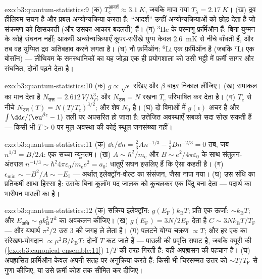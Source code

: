 \begin{solution}{exo:b3:quantum-statistics:9}
(क) $T_{\text{c}}^{\text{आदर्श}} \approx \qty{3.1}{K}$, जबकि
मापा गया $T_\lambda = \qty{2.17}{K}$। (ख) द्रव हीलियम सघन है और
प्रबल अन्योन्यक्रिया करता है: ``आदर्श'' उन्हीं अन्योन्यक्रियाओं को
छोड़ देता है जो संक्रमण को खिसकाती (और उसका आकार बदलती) हैं। (ग)
$^3$He के परमाणु फ़र्मिऑन हैं: बिना युग्मन के कोई संघनन नहीं;
आकर्षी अन्योन्यक्रियाएँ कूपर-सरीखे युग्म केवल \qty{2.6}{mK} से
नीचे बाँधती हैं, और तब वह युग्मित द्रव अतिबहाव करने लगता है। (घ) नौ
फ़र्मिऑन: $^6$Li एक फ़र्मिऑन है (जबकि
$^7$Li एक बोसॉन) --- लीथियम के समस्थानिकों का यह जोड़ा एक ही
प्रयोगशाला को उसी भट्ठी में फ़र्मी सागर और संघनित, दोनों पढ़ने देता है।
\end{solution}

\begin{solution}{exo:b3:quantum-statistics:10}
(क) $g \propto \sqrt\epsilon$ रखिए और $\beta$ बाहर निकाल लीजिए।
(ख) समाकल का मान देता है $N_{\text{उत्त}} =
2.612\,V/\lambda_T^3$; और $N_{\text{उत्त}} = N$ रखना
$T_{\text{c}}$ परिभाषित कर देता है। (ग) $T_{\text{c}}$ से नीचे $N_{\text{उत्त}}(T) =
N(T/T_{\text{c}})^{3/2}$; और शेष $N_0$ है। (घ) दो
विमाओं में $g(\epsilon)$ अचर है और $\int\dd\epsilon/(\eu^{
\beta\epsilon} - 1)$ तली पर अपसरित हो जाता है: उत्तेजित अवस्थाएँ
सबको सदा सोख सकती हैं --- किसी भी $T > 0$ पर मूल अवस्था की कोई
स्थूल जनसंख्या नहीं।
\end{solution}

\begin{solution}{exo:b3:quantum-statistics:11}
(क) $\dd\epsilon/\dd n = \tfrac23 An^{-1/3} - \tfrac13 Bn^{-2/3} =
0$ तब, जब $n^{1/3} = B/2A$: एक सच्चा न्यूनतम। (ख) $A \sim
\hbar^2/m_{\text{e}}$ और $B \sim e^2/4\pi\varepsilon_0$ के साथ
संतुलन-अंतराल $n^{-1/3} \sim \hbar^2 4\pi\varepsilon_0/
m_{\text{e}}e^2 = a_0$: धातुएँ सघन इसलिए हैं कि 
ऐसा कहती है। (ग) $\epsilon_{\min} \sim -B^2/A \sim -E_{\text{I}}$
--- अर्थात् इलेक्ट्रॉन-वोल्ट का संसंजन, जैसा नापा गया। (घ) 
उस संधि का प्रतिकर्षी आधा हिस्सा है: उसके बिना कूलॉम पद
जालक को कुचलकर एक बिंदु बना देता --- पदार्थ का भारीपन पाउली का है।
\end{solution}

\begin{solution}{exo:b3:quantum-statistics:12}
(क) सक्रिय इलेक्ट्रॉन: $g(E_{\text{F}})k_{\text{B}}T$; प्रति एक
ऊर्जा: $\sim k_{\text{B}}T$; और $E_{\text{अति}} \sim
g k_{\text{B}}^2T^2$ का अवकलन कीजिए। (ख) $g(E_{\text{F}}) = 3N/2E_{\text{F}}$
देता है $C \sim 3Nk_{\text{B}}T/T_{\text{F}}$ --- और यथार्थ
$\pi^2/2$ उस 3 की जगह ले लेता है। (ग) पलटने योग्य चक्रण $\propto T$;
और हर एक का संरेखण-योगदान $\propto \mu^2B/k_{\text{B}}T$: दोनों $T$
कट जाते हैं --- पाउली की प्रवृत्ति सपाट है, जबकि क्यूरी की
(\cref{exo:b3:canonical-ensemble:11}) $1/T$ की तरह गिरती है: यही
अपह्रासन की पहचान है। (घ) अपह्रासित फ़र्मिऑन केवल अपनी सतह पर
अनुक्रिया करते हैं: किसी भी चिरसम्मत उत्तर को $\sim
T/T_{\text{F}}$ से गुणा कीजिए, या उसे फ़र्मी कोश तक सीमित कर दीजिए।
\end{solution}

